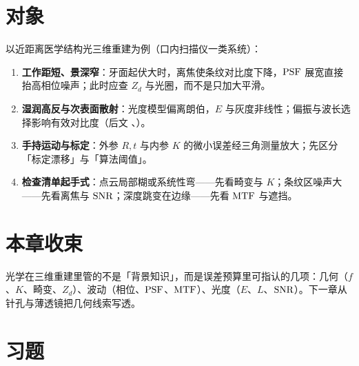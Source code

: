 \section{对象}
\label{sec:ch00-object}

以近距离医学结构光三维重建为例（口内扫描仪一类系统）：
\begin{enumerate}
  \item \textbf{工作距短、景深窄}：牙面起伏大时，离焦使条纹对比度下降，$\mathrm{PSF}$ 展宽直接抬高相位噪声；此时应查 $Z_d$ 与光圈，而不是只加大平滑。
  \item \textbf{湿润高反与次表面散射}：光度模型偏离朗伯，$E$ 与灰度非线性；偏振与波长选择影响有效对比度（后文 、）。
  \item \textbf{手持运动与标定}：外参 $R,t$ 与内参 $K$ 的微小误差经三角测量放大；先区分「标定漂移」与「算法阈值」。
  \item \textbf{检查清单起手式}：点云局部糊或系统性弯——先看畸变与 $K$；条纹区噪声大——先看离焦与 $\mathrm{SNR}$；深度跳变在边缘——先看 $\mathrm{MTF}$ 与遮挡。
\end{enumerate}


\section*{本章收束}
光学在三维重建里管的不是「背景知识」，而是误差预算里可指认的几项：几何（$f$、$K$、畸变、$Z_d$）、波动（相位、$\mathrm{PSF}$、$\mathrm{MTF}$）、光度（$E$、$L$、$\mathrm{SNR}$）。下一章从针孔与薄透镜把几何线索写透。

\section{习题}
\label{sec:ch00-exercises}

